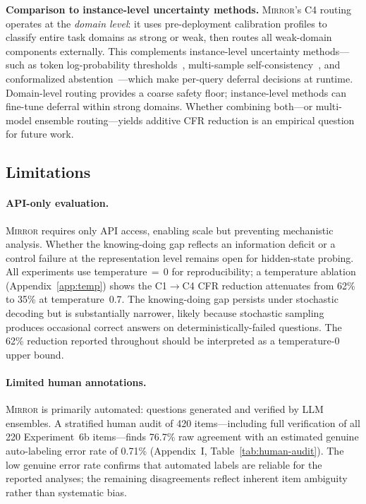 \documentclass[10pt]{article}
\newcommand{\mirror}{\textsc{Mirror}}
\begin{document}
\textbf{Comparison to instance-level uncertainty methods.} \mirror{}'s C4 routing operates at the \textit{domain level}: it uses pre-deployment calibration profiles to classify entire task domains as strong or weak, then routes all weak-domain components externally. This complements instance-level uncertainty methods---such as token log-probability thresholds~\citep{lin2024generating}, multi-sample self-consistency~\citep{wang2023selfconsistency}, and conformalized abstention~\citep{angelopoulos2021conformal}---which make per-query deferral decisions at runtime. Domain-level routing provides a coarse safety floor; instance-level methods can fine-tune deferral within strong domains. Whether combining both---or multi-model ensemble routing---yields additive CFR reduction is an empirical question for future work.

\subsection{Limitations}

\paragraph{API-only evaluation.}
\mirror{} requires only API access, enabling scale but preventing mechanistic
analysis. Whether the knowing-doing gap reflects an information deficit or a
control failure at the representation level remains open for hidden-state probing.
All experiments use temperature$\,=\,0$ for reproducibility; a temperature ablation (Appendix~\ref{app:temp}) shows the C1$\to$C4 CFR reduction attenuates from 62\% to 35\% at temperature~0.7. The knowing-doing gap persists under stochastic decoding but is substantially narrower, likely because stochastic sampling produces occasional correct answers on deterministically-failed questions. The 62\% reduction reported throughout should be interpreted as a temperature-0 upper bound.

\paragraph{Limited human annotations.}
\mirror{} is primarily automated: questions generated and verified by LLM ensembles. A stratified human audit of 420 items---including full verification of all 220 Experiment~6b items---finds 76.7\% raw agreement with an estimated genuine auto-labeling error rate of 0.71\% (Appendix~I, Table~\ref{tab:human-audit}). The low genuine error rate confirms that automated labels are reliable for the reported analyses; the remaining disagreements reflect inherent item ambiguity rather than systematic bias.
\end{document}
